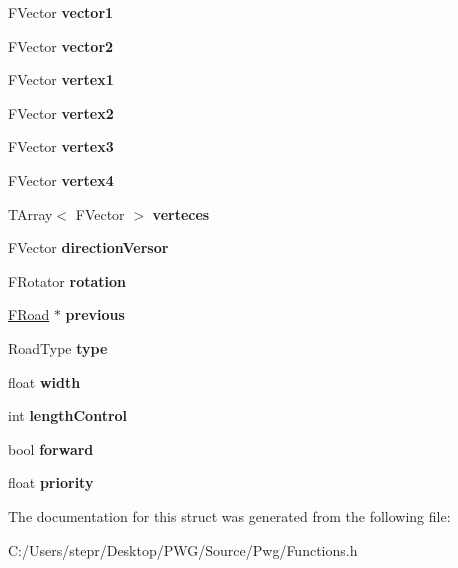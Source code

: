 \begin{DoxyCompactItemize}
\item 
\mbox{\label{struct_f_road_a03349366f21b364cd9c915f8cac2f359}} 
F\+Vector {\bfseries vector1}
\item 
\mbox{\label{struct_f_road_ac007d0b9dfa960a237723904f22e2a49}} 
F\+Vector {\bfseries vector2}
\item 
\mbox{\label{struct_f_road_a34b789098cb9eae97e6c700499b6f30f}} 
F\+Vector {\bfseries vertex1}
\item 
\mbox{\label{struct_f_road_a8e203e335c85580580e76a2c1d5990ec}} 
F\+Vector {\bfseries vertex2}
\item 
\mbox{\label{struct_f_road_ad820d3fbf8d89d828f0c3d59c6183693}} 
F\+Vector {\bfseries vertex3}
\item 
\mbox{\label{struct_f_road_a384e4b4588f0fda576309f997018ba4a}} 
F\+Vector {\bfseries vertex4}
\item 
\mbox{\label{struct_f_road_a7c53159edc1b35871de4be0d5069c163}} 
T\+Array$<$ F\+Vector $>$ {\bfseries verteces}
\item 
\mbox{\label{struct_f_road_a915dc7d17b665fb7178b5042e45834bd}} 
F\+Vector {\bfseries direction\+Versor}
\item 
\mbox{\label{struct_f_road_a5dd9b0fb8c926d3ab19ca8ce3b609f91}} 
F\+Rotator {\bfseries rotation}
\item 
\mbox{\label{struct_f_road_ab1865b9edceb633bf702f6df67d20d05}} 
\mbox{\hyperlink{struct_f_road}{F\+Road}} $\ast$ {\bfseries previous}
\item 
\mbox{\label{struct_f_road_a71e2ad3a43dcc928764ebc1b7f404ebd}} 
Road\+Type {\bfseries type}
\item 
\mbox{\label{struct_f_road_a94584b7e64427e47f11762477b71c63e}} 
float {\bfseries width}
\item 
\mbox{\label{struct_f_road_ad9e35dd52db82f67880749aa55b5410b}} 
int {\bfseries length\+Control}
\item 
\mbox{\label{struct_f_road_a47aee4bf5e59e9040cd22b0a465d7b4d}} 
bool {\bfseries forward}
\item 
\mbox{\label{struct_f_road_a5861c4a34d15a0bf64084c90a6b397dd}} 
float {\bfseries priority}
\end{DoxyCompactItemize}


The documentation for this struct was generated from the following file\+:\begin{DoxyCompactItemize}
\item 
C\+:/\+Users/stepr/\+Desktop/\+P\+W\+G/\+Source/\+Pwg/Functions.\+h\end{DoxyCompactItemize}
